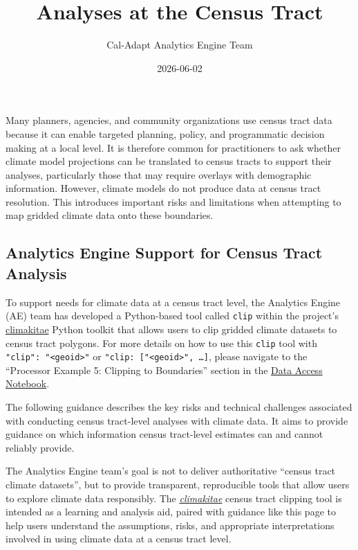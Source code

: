 \documentclass[
  letterpaper,
  DIV=11,
  numbers=noendperiod]{scrartcl}
\title{Analyses at the Census Tract}
\author{Cal-Adapt Analytics Engine Team}
\date{2026-06-02}
\begin{document}
\maketitle


Many planners, agencies, and community organizations use census tract
data because it can enable targeted planning, policy, and programmatic
decision making at a local level. It is therefore common for
practitioners to ask whether climate model projections can be translated
to census tracts to support their analyses, particularly those that may
require overlays with demographic information. However, climate models
do not produce data at census tract resolution. This introduces
important risks and limitations when attempting to map gridded climate
data onto these boundaries.

\subsection{Analytics Engine Support for Census Tract
Analysis}\label{analytics-engine-support-for-census-tract-analysis}

To support needs for climate data at a census tract level, the Analytics
Engine (AE) team has developed a Python-based tool called \texttt{clip}
within the project's
\href{https://github.com/cal-adapt/climakitae}{climakitae} Python
toolkit that allows users to clip gridded climate datasets to census
tract polygons. For more details on how to use this \texttt{clip} tool
with \texttt{"clip":\ "\textless{}geoid\textgreater{}"} or
\texttt{"clip:\ {[}"\textless{}geoid\textgreater{}",\ …{]}}, please
navigate to the ``Processor Example 5: Clipping to Boundaries'' section
in the
\href{https://github.com/cal-adapt/cae-notebooks/blob/main/basic_data_access.ipynb}{Data
Access Notebook}.

The following guidance describes the key risks and technical challenges
associated with conducting census tract-level analyses with climate
data. It aims to provide guidance on which information census
tract-level estimates can and cannot reliably provide.

The Analytics Engine team's goal is not to deliver authoritative
``census tract climate datasets'', but to provide transparent,
reproducible tools that allow users to explore climate data responsibly.
The \emph{\href{https://github.com/cal-adapt/climakitae}{climakitae}}
census tract clipping tool is intended as a learning and analysis aid,
paired with guidance like this page to help users understand the
assumptions, risks, and appropriate interpretations involved in using
climate data at a census tract level.
\end{document}
